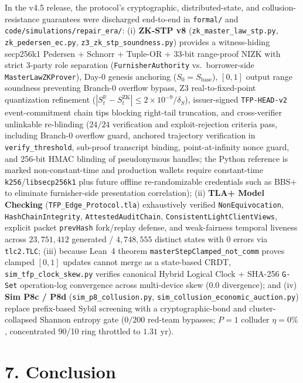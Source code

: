 \documentclass[11pt,twocolumn]{article}
\begin{document}
In the v4.5 release, the protocol's cryptographic, distributed-state, and collusion-resistance guarantees were discharged end-to-end in \texttt{formal/} and \texttt{code/simulations/repair\_era/}: (i) \textbf{ZK-STP v8} (\texttt{zk\_master\_law\_stp.py}, \texttt{zk\_pedersen\_ec.py}, \texttt{z3\_zk\_stp\_soundness.py}) provides a witness-hiding secp256k1 Pedersen + Schnorr + Tuple-OR + 33-bit range-proof NIZK with strict 3-party role separation (\texttt{FurnisherAuthority} vs.\ borrower-side \texttt{MasterLawZKProver}), Day-0 genesis anchoring ($S_0 = S_{\text{base}}$), $[0, 1]$ output range soundness preventing Branch-0 overflow bypass, Z3 real-to-fixed-point quantization refinement ($|S_t^{\mathbb{R}} - S_t^{\text{ZK}}| \le 2\times 10^{-9}/\delta_S$), issuer-signed \texttt{TFP-HEAD-v2} event-commitment chain tips blocking right-tail truncation, and cross-verifier unlinkable re-blinding ($24/24$ verification and exploit-rejection criteria pass, including Branch-0 overflow guard, anchored trajectory verification in \texttt{verify\_threshold}, sub-proof transcript binding, point-at-infinity nonce guard, and 256-bit HMAC blinding of pseudonymous handles; the Python reference is marked non-constant-time and production wallets require constant-time \texttt{k256}/\texttt{libsecp256k1} plus future offline re-randomizable credentials such as BBS+ to eliminate furnisher-side presentation correlation); (ii) \textbf{TLA+ Model Checking} (\texttt{TFP\_Edge\_Protocol.tla}) exhaustively verified \texttt{NonEquivocation}, \texttt{HashChainIntegrity}, \texttt{AttestedAuditChain}, \texttt{ConsistentLightClientViews}, explicit packet \texttt{prevHash} fork/replay defense, and weak-fairness temporal liveness across $23{,}751{,}412$ generated / $4{,}748{,}555$ distinct states with $0$ errors via \texttt{tlc2.TLC}; (iii) because Lean~4 theorem \texttt{masterStepClamped\_not\_comm} proves clamped $[0,1]$ updates cannot merge as a state-based CRDT, \texttt{sim\_tfp\_clock\_skew.py} verifies canonical Hybrid Logical Clock + SHA-256 \texttt{G-Set} operation-log convergence across multi-device skew ($0.0$ divergence); and (iv) \textbf{Sim P8c / P8d} (\texttt{sim\_p8\_collusion.py}, \texttt{sim\_collusion\_economic\_auction.py}) replace prefix-based Sybil screening with a cryptographic-bond and cluster-collapsed Shannon entropy gate ($0/200$ red-team bypasses; $P=1$ colluder $\eta = 0\%$, concentrated 90/10 ring throttled to $1.31\text{ yr}$).

\FloatBarrier
\section*{7. Conclusion}
\end{document}
